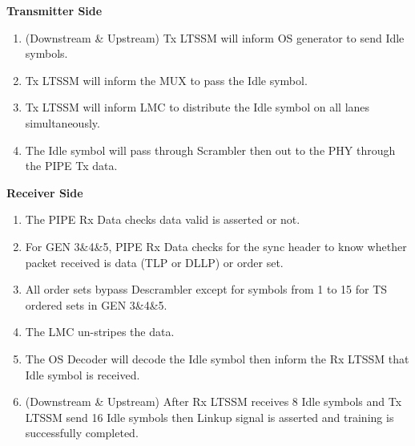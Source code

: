 \begin{enumerate}
\newline\textbf{Transmitter Side}
\begin{enumerate}
  \item (Downstream \& Upstream) Tx LTSSM will inform OS generator to send Idle symbols.
  \item Tx LTSSM will inform the MUX to pass the Idle symbol.
  \item Tx LTSSM will inform LMC to distribute the Idle symbol on all lanes simultaneously.
  \item The Idle symbol will pass through Scrambler then out to the PHY through the PIPE Tx data.
\end{enumerate}
\textbf{Receiver Side}
\begin{enumerate}
  \item The PIPE Rx Data checks data valid is asserted or not.
  \item For GEN 3\&4\&5, PIPE Rx Data checks for the sync header to know whether packet received is data (TLP or DLLP) or order set.
  \item All order sets bypass Descrambler except for symbols from 1 to 15 for TS ordered sets in GEN 3\&4\&5.
  \item The LMC un-stripes the data.
  \item The OS Decoder will decode the Idle symbol then inform the Rx LTSSM that Idle symbol is received.
  \item (Downstream \& Upstream) After Rx LTSSM receives 8 Idle symbols and Tx LTSSM send 16 Idle symbols then Linkup signal is asserted and training is successfully completed.
\end{enumerate}
\end{enumerate}

